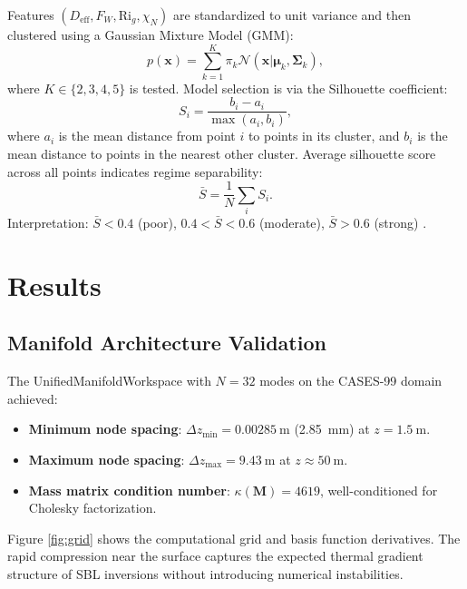 \documentclass[11pt,a4paper]{article}
\begin{document}
Features $(D_{\mathrm{eff}}, F_W, \mathrm{Ri}_g, \chi_N)$ are standardized to unit variance and then clustered using a Gaussian Mixture Model (GMM):
\begin{equation}
p(\mathbf{x}) = \sum_{k=1}^{K} \pi_k \mathcal{N}(\mathbf{x} | \boldsymbol{\mu}_k, \boldsymbol{\Sigma}_k),
\end{equation}
where $K \in \{2, 3, 4, 5\}$ is tested. Model selection is via the Silhouette coefficient:
\begin{equation}
S_i = \frac{b_i - a_i}{\max(a_i, b_i)},
\end{equation}
where $a_i$ is the mean distance from point $i$ to points in its cluster, and $b_i$ is the mean distance to points in the nearest other cluster. Average silhouette score across all points indicates regime separability:
\begin{equation}
\bar{S} = \frac{1}{N} \sum_i S_i.
\end{equation}
Interpretation: $\bar{S} < 0.4$ (poor), $0.4 < \bar{S} < 0.6$ (moderate), $\bar{S} > 0.6$ (strong) \citep{Rousseeuw1987}.

\section{Results}
\label{sec:results}

\subsection{Manifold Architecture Validation}
\label{sec:results:manifold}

The UnifiedManifoldWorkspace with $N = 32$ modes on the CASES-99 domain achieved:
\begin{itemize}
  \item \textbf{Minimum node spacing}: $\Delta z_{\min} = \SI{0.00285}{\meter}$ (\SI{2.85}{\milli\meter}) at $z = \SI{1.5}{\meter}$.
  \item \textbf{Maximum node spacing}: $\Delta z_{\max} = \SI{9.43}{\meter}$ at $z \approx \SI{50}{\meter}$.
  \item \textbf{Mass matrix condition number}: $\kappa(\mathbf{M}) = 4619$, well-conditioned for Cholesky factorization.
\end{itemize}

Figure \ref{fig:grid} shows the computational grid and basis function derivatives. The rapid compression near the surface captures the expected thermal gradient structure of SBL inversions without introducing numerical instabilities.
\end{document}
